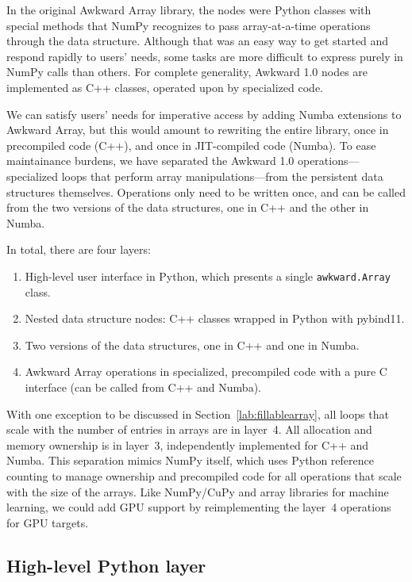\documentclass{webofc}
\begin{document}
In the original Awkward Array library, the nodes were Python classes with special methods that NumPy recognizes to pass array-at-a-time operations through the data structure. Although that was an easy way to get started and respond rapidly to users' needs, some tasks are more difficult to express purely in NumPy calls than others. For complete generality, Awkward 1.0 nodes are implemented as C++ classes, operated upon by specialized code.

We can satisfy users' needs for imperative access by adding Numba extensions to Awkward Array, but this would amount to rewriting the entire library, once in precompiled code (C++), and once in JIT-compiled code (Numba). To ease maintainance burdens, we have separated the Awkward 1.0 operations---specialized loops that perform array manipulations---from the persistent data structures themselves. Operations only need to be written once, and can be called from the two versions of the data structures, one in C++ and the other in Numba.

In total, there are four layers:

\begin{enumerate}
\item High-level user interface in Python, which presents a single \texttt{awkward.Array} class.
\item Nested data structure nodes: C++ classes wrapped in Python with pybind11.
\item Two versions of the data structures, one in C++ and one in Numba.
\item Awkward Array operations in specialized, precompiled code with a pure C interface (can be called from C++ and Numba).
\end{enumerate}

\noindent With one exception to be discussed in Section~\ref{lab:fillablearray}, all loops that scale with the number of entries in arrays are in layer~4. All allocation and memory ownership is in layer~3, independently implemented for C++ and Numba. This separation mimics NumPy itself, which uses Python reference counting to manage ownership and precompiled code for all operations that scale with the size of the arrays. Like NumPy/CuPy and array libraries for machine learning, we could add GPU support by reimplementing the layer~4 operations for GPU targets.

\subsection{High-level Python layer}
\end{document}
